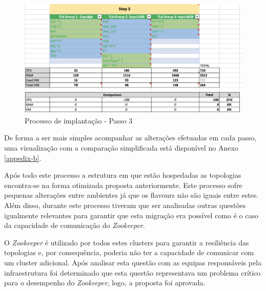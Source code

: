 \begin{figure}[H]
  \centerline{\includegraphics[scale=0.5]{media/content/analise/strat-3.png}}
  \caption{Processo de implantação - Passo 3}
  \label{strat-3}
\end{figure}

De forma a ser mais simples acompanhar as alterações efetuadas em cada passo, uma visualização
com a comparação simplificada está disponível no Anexo \ref{appedix-b}.

Após todo este processo a estrutura em que estão hospedadas as topologias encontra-se na forma
otimizada proposta anteriormente. Este processo sofre pequenas alterações entre ambientes já que 
os \glspl{flavour} não são iguais entre estes. Além disso, durante este processo tiveram que ser 
analisadas outras questões igualmente relevantes para garantir que esta migração era possível como 
é o caso da capacidade de comunicação do \textit{Zookeeper}.

O \textit{Zookeeper} é utilizado por todos estes \glspl{cluster} para garantir a resiliência das 
topologias e, por consequência, poderia não ter a capacidade de comunicar com um \gls{cluster}
adicional. Após analisar esta questão com as equipas responsáveis pela infraestrutura foi 
determinado que esta questão representava um problema crítico para o desempenho do 
\textit{Zookeeper}, logo, a proposta foi aprovada.

